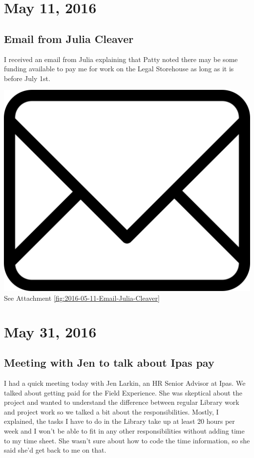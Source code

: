 \documentclass{article}
\begin{document}
\section{May 11, 2016}
\subsection{Email from Julia Cleaver}
I received an email from Julia explaining that Patty noted there may be some funding available to pay me for work on the Legal Storehouse as long as it is before July 1st.

\vspace{2em}
\noindent\includegraphics[height=\fontcharht\font`\B]{icons/attachment-email} See Attachment \ref{fig:2016-05-11-Email-Julia-Cleaver}
\vspace{2em}

\section{May 31, 2016}
\subsection{Meeting with Jen to talk about Ipas pay}
I had a quick meeting today with Jen Larkin, an HR Senior Advisor at Ipas. We talked about getting paid for the Field Experience. She was skeptical about the project and wanted to understand the difference between regular Library work and project work so we talked a bit about the responsibilities. Mostly, I explained, the tasks I have to do in the Library take up at least 20 hours per week and I won't be able to fit in any other responsibilities without adding time to my time sheet. She wasn't sure about how to code the time information, so she said she'd get back to me on that.
\end{document}
